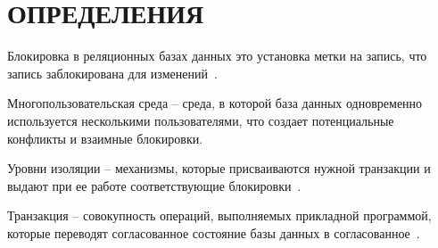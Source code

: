 \chapter*{\hfill{\centering ОПРЕДЕЛЕНИЯ}\hfill}

Блокировка в реляционных базах данных это установка метки на запись, что запись заблокирована для изменений~\cite{lock}.

Многопользовательская среда -- среда, в которой база данных одновременно используется несколькими пользователями, что создает потенциальные конфликты и взаимные блокировки.

Уровни изоляции -- механизмы, которые присваиваются нужной транзакции и выдают при ее работе соответствующие блокировки~\cite{isolation}.

Транзакция -- совокупность операций, выполняемых прикладной программой, которые переводят согласованное состояние базы данных в согласованное~\cite{transaction}.
